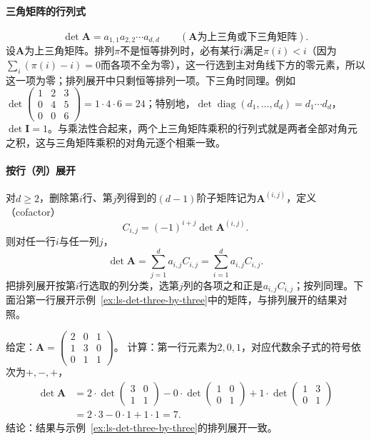 \paragraph{三角矩阵的行列式}
\[
 \det\bm A=a_{1,1}a_{2,2}\cdots a_{d,d}\qquad(\bm A\text{为上三角或下三角矩阵}).
\]
设$\bm A$为上三角矩阵。排列$\pi$不是恒等排列时，必有某行$i$满足$\pi(i)<i$（因为$\sum_i(\pi(i)-i)=0$而各项不全为零），这一行选到主对角线下方的零元素，所以这一项为零；排列展开中只剩恒等排列一项。下三角时同理。例如$\det\left(\begin{smallmatrix}1&2&3\\0&4&5\\0&0&6\end{smallmatrix}\right)=1\cdot4\cdot6=24$；特别地，$\det\operatorname{diag}(d_1,\ldots,d_d)=d_1\cdots d_d$，$\det\bm I=1$。与乘法性合起来，两个上三角矩阵乘积的行列式就是两者全部对角元之积，这与三角矩阵乘积的对角元逐个相乘一致。

\paragraph{按行（列）展开}
对$d\geq2$，删除第$i$行、第$j$列得到的$(d-1)$阶子矩阵记为$\bm A^{(i,j)}$，定义（cofactor）
\[
 C_{i,j}=(-1)^{i+j}\det\bm A^{(i,j)}.
\]
则对任一行$i$与任一列$j$，
\[
 \det\bm A=\sum_{j=1}^d a_{i,j}C_{i,j}=\sum_{i=1}^d a_{i,j}C_{i,j}.
\]
把排列展开按第$i$行选取的列分类，选第$j$列的各项之和正是$a_{i,j}C_{i,j}$；按列同理。下面沿第一行展开示例~\ref{ex:ls-det-three-by-three}中的矩阵，与排列展开的结果对照。
\begin{example}[沿第一行展开三阶行列式]
\label{ex:ls-det-cofactor-expansion}
给定：$\bm A=\left(\begin{smallmatrix}2&0&1\\1&3&0\\0&1&1\end{smallmatrix}\right)$。
计算：第一行元素为$2,0,1$，对应代数余子式的符号依次为$+,-,+$，
\[
 \begin{aligned}
 \det\bm A
 &=2\cdot\det\begin{pmatrix}3&0\\1&1\end{pmatrix}
 -0\cdot\det\begin{pmatrix}1&0\\0&1\end{pmatrix}
 +1\cdot\det\begin{pmatrix}1&3\\0&1\end{pmatrix}\\
 &=2\cdot3-0\cdot1+1\cdot1=7.
 \end{aligned}
\]
结论：结果与示例~\ref{ex:ls-det-three-by-three}的排列展开一致。
\end{example}

